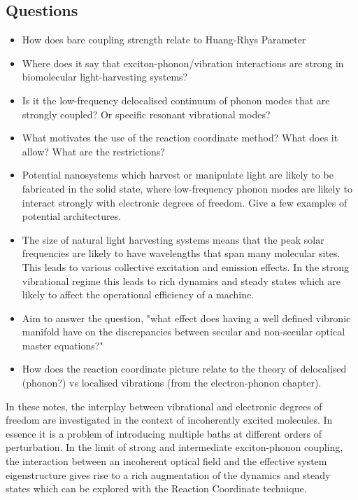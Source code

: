 \documentclass[]{article}
\begin{document}
\subsection{Questions}

\begin{itemize}
	\item How does bare coupling strength relate to Huang-Rhys Parameter
	\item Where does it say that exciton-phonon/vibration interactions are strong in biomolecular light-harvesting systems?
	\item Is it the low-frequency delocalised continuum of phonon modes that are strongly coupled? Or specific resonant vibrational modes?
	\item What motivates the use of the reaction coordinate method? What does it allow? What are the restrictions?
	\item Potential nanosystems which harvest or manipulate light are likely to be fabricated in the solid state, where low-frequency phonon modes are likely to interact strongly with electronic degrees of freedom. Give a few examples of potential architectures.
	\item The size of natural light harvesting systems means that the peak solar frequencies are likely to have wavelengths that span many molecular sites. This leads to various collective excitation and emission effects. In the strong vibrational regime this leads to rich dynamics and steady states which are likely to affect the operational efficiency of a machine.
	\item Aim to answer the question, "what effect does having a well defined vibronic manifold have on the discrepancies between secular and non-secular optical master equations?" 
	\item How does the reaction coordinate picture relate to the theory of delocalised (phonon?) vs localised vibrations (from the electron-phonon chapter). 
\end{itemize}
In these notes, the interplay between vibrational and electronic degrees of freedom are investigated in the context of incoherently excited molecules. In essence it is a problem of introducing multiple baths at different orders of perturbation. In the limit of strong and intermediate exciton-phonon coupling, the interaction between an incoherent optical field and the effective system eigenstructure gives rise to a rich augmentation of the dynamics and steady states which can be explored with the Reaction Coordinate technique.
\end{document}
